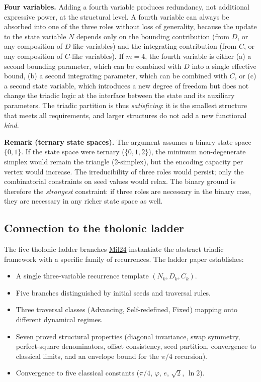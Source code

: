 \documentclass[12pt]{article}
\providecommand{\tightlist}{%
  \setlength{\itemsep}{0pt}\setlength{\parskip}{0pt}}
\begin{document}
\textbf{Four variables.} Adding a fourth variable produces redundancy,
not additional expressive power, at the structural level. A fourth
variable can always be absorbed into one of the three roles without loss
of generality, because the update to the state variable \(N\) depends
only on the bounding contribution (from \(D\), or any composition of
\(D\)-like variables) and the integrating contribution (from \(C\), or
any composition of \(C\)-like variables). If \(m = 4\), the fourth
variable is either (a) a second bounding parameter, which can be
combined with \(D\) into a single effective bound, (b) a second
integrating parameter, which can be combined with \(C\), or (c) a second
state variable, which introduces a new degree of freedom but does not
change the triadic logic at the interface between the state and its
auxiliary parameters. The triadic partition is thus \emph{satisficing}:
it is the smallest structure that meets all requirements, and larger
structures do not add a new functional \emph{kind}.

\textbf{Remark (ternary state spaces).} The argument assumes a binary
state space \(\{0, 1\}\). If the state space were ternary
(\(\{0, 1, 2\}\)), the minimum non-degenerate simplex would remain the
triangle (2-simplex), but the encoding capacity per vertex would
increase. The irreducibility of three roles would persist; only the
combinatorial constraints on seed values would relax. The binary ground
is therefore the \emph{strongest} constraint: if three roles are
necessary in the binary case, they are necessary in any richer state
space as well.

\subsection{Connection to the tholonic ladder}\label{connection-to-the-tholonic-ladder}

The five tholonic ladder branches
\href{https://tholonia.github.io/the-book/}{Mil24} instantiate the
abstract triadic framework with a specific family of recurrences. The
ladder paper establishes:

\begin{itemize}
\tightlist
\item
  A single three-variable recurrence template \((N_k, D_k, C_k)\).
\item
  Five branches distinguished by initial seeds and traversal rules.
\item
  Three traversal classes (Advancing, Self-redefined, Fixed) mapping
  onto different dynamical regimes.
\item
  Seven proved structural properties (diagonal invariance, swap
  symmetry, perfect-square denominators, offset consistency, seed
  partition, convergence to classical limits, and an envelope bound for
  the \(\pi/4\) recursion).
\item
  Convergence to five classical constants (\(\pi/4\), \(\varphi\),
  \(e\), \(\sqrt{2}\), \(\ln 2\)).
\end{itemize}
\end{document}
